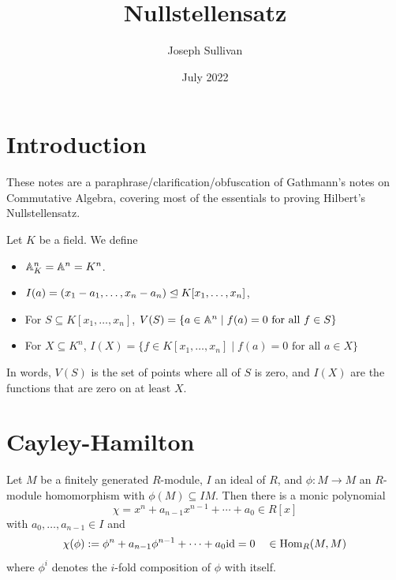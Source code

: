 \documentclass[12pt]{article}
\title{Nullstellensatz}
\author{Joseph Sullivan}
\date{July 2022}
\begin{document}
\maketitle

\section{Introduction}

These notes are a paraphrase/clarification/obfuscation of Gathmann's notes on Commutative Algebra, covering most of the essentials to proving Hilbert's Nullstellensatz.

\begin{defn}
    Let $K$ be a field. We define
    \begin{itemize}
        \item $\mathbb{A}_K^n = \mathbb{A}^n = K^n$.
        \item $I(a) = (x_1-a_1,\dots,x_n-a_n) \trianglelefteq K[x_1,\dots,x_n]$,
        \item For $S\subseteq K[x_1,\dots,x_n]$, $V(S) = \{a\in \mathbb{A}^n \mid f(a)=0 \text{ for all } f\in S\}$
        \item For $X\subseteq K^n$, $I(X) = \{f\in K[x_1,\dots,x_n] \mid f(a)=0 \text{ for all } a\in X\}$
    \end{itemize}
    In words, $V(S)$ is the set of points where all of $S$ is zero, and $I(X)$ are the functions that are zero on at least $X$.
\end{defn}

\section{Cayley-Hamilton}

\begin{thm}\label{cayham}
    Let $M$ be a finitely generated $R$-module, $I$ an ideal of $R$, and $\phi: M\to M$ an $R$-module homomorphism with $\phi(M)\subseteq IM$. Then there is a monic polynomial
    \[\chi = x^n + a_{n-1} x^{n-1} + \cdots + a_0 \in R[x]\]
    with $a_0,\dots,a_{n-1}\in I$ and
    \[\chi(\phi) \defeq \phi^n + a_{n-1}\phi^{n-1} + \cdots + a_0 \id = 0 \quad \in \Hom_R(M,M)\]
    where $\phi^i$ denotes the $i$-fold composition of $\phi$ with itself.
\end{thm}
\end{document}
